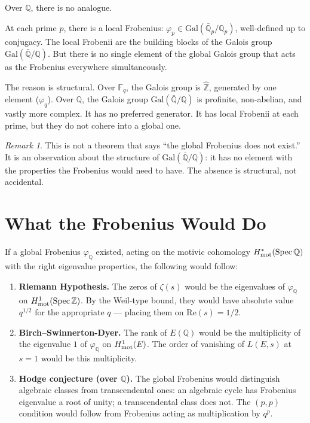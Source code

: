 \documentclass[12pt]{article}
\theoremstyle{definition}
\theoremstyle{remark}
\newtheorem{remark}[theorem]{Remark}
\begin{document}
Over $\mathbb{Q}$, there is no analogue.

At each prime $p$, there is a local Frobenius:
$\varphi_p \in \mathrm{Gal}(\bar{\mathbb{Q}}_p/\mathbb{Q}_p)$,
well-defined up to conjugacy.
The local Frobenii are the building blocks of the Galois group $\mathrm{Gal}(\bar{\mathbb{Q}}/\mathbb{Q})$.
But there is no single element of the global Galois group
that acts as the Frobenius everywhere simultaneously.

The reason is structural.
Over $\mathbb{F}_q$, the Galois group is $\hat{\mathbb{Z}}$,
generated by one element ($\varphi_q$).
Over $\mathbb{Q}$, the Galois group $\mathrm{Gal}(\bar{\mathbb{Q}}/\mathbb{Q})$
is profinite, non-abelian, and vastly more complex.
It has no preferred generator.
It has local Frobenii at each prime,
but they do not cohere into a global one.

\begin{remark}
This is not a theorem that says ``the global Frobenius does not exist.''
It is an observation about the structure of $\mathrm{Gal}(\bar{\mathbb{Q}}/\mathbb{Q})$:
it has no element with the properties the Frobenius would need to have.
The absence is structural, not accidental.
\end{remark}

\section{What the Frobenius Would Do}

If a global Frobenius $\varphi_{\mathbb{Q}}$ existed,
acting on the motivic cohomology $H^*_{\rm mot}(\mathrm{Spec}\,\mathbb{Q})$
with the right eigenvalue properties,
the following would follow:

\begin{enumerate}
\item \textbf{Riemann Hypothesis.}
The zeros of $\zeta(s)$ would be the eigenvalues of $\varphi_{\mathbb{Q}}$
on $H^1_{\rm mot}(\mathrm{Spec}\,\mathbb{Z})$.
By the Weil-type bound, they would have absolute value $q^{1/2}$
for the appropriate $q$ --- placing them on $\mathrm{Re}(s) = 1/2$.

\item \textbf{Birch--Swinnerton-Dyer.}
The rank of $E(\mathbb{Q})$ would be the multiplicity of the eigenvalue $1$
of $\varphi_{\mathbb{Q}}$ on $H^1_{\rm mot}(E)$.
The order of vanishing of $L(E,s)$ at $s=1$ would be this multiplicity.

\item \textbf{Hodge conjecture (over $\mathbb{Q}$).}
The global Frobenius would distinguish algebraic classes
from transcendental ones:
an algebraic cycle has Frobenius eigenvalue a root of unity;
a transcendental class does not.
The $(p,p)$ condition would follow from Frobenius acting as
multiplication by $q^p$.
\end{enumerate}
\end{document}
